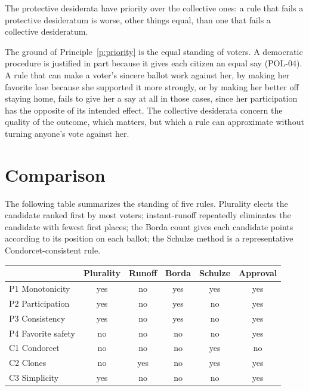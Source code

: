 \documentclass{situationist-preprint}
\begin{document}
\begin{principle}\label{p:priority}
The protective desiderata have priority over the collective ones: a rule that fails a protective desideratum is worse, other things equal, than one that fails a collective desideratum.
\end{principle}

The ground of Principle~\ref{p:priority} is the equal standing of voters. A democratic procedure is justified in part because it gives each citizen an equal say (POL-04). A rule that can make a voter's sincere ballot work against her, by making her favorite lose because she supported it more strongly, or by making her better off staying home, fails to give her a say at all in those cases, since her participation has the opposite of its intended effect. The collective desiderata concern the quality of the outcome, which matters, but which a rule can approximate without turning anyone's vote against her.

\section{Comparison}

The following table summarizes the standing of five rules. Plurality elects the candidate ranked first by most voters; instant-runoff repeatedly eliminates the candidate with fewest first places; the Borda count gives each candidate points according to its position on each ballot; the Schulze method is a representative Condorcet-consistent rule.

\begin{center}\small
\begin{tabular}{lccccc}
\hline
 & Plurality & Runoff & Borda & Schulze & Approval \\
\hline
P1 Monotonicity & yes & no & yes & yes & yes \\
P2 Participation & yes & no & yes & no & yes \\
P3 Consistency & yes & no & yes & no & yes \\
P4 Favorite safety & no & no & no & no & yes \\
C1 Condorcet & no & no & no & yes & no \\
C2 Clones & no & yes & no & yes & yes \\
C3 Simplicity & yes & no & no & no & yes \\
\hline
\end{tabular}
\end{center}
\end{document}
